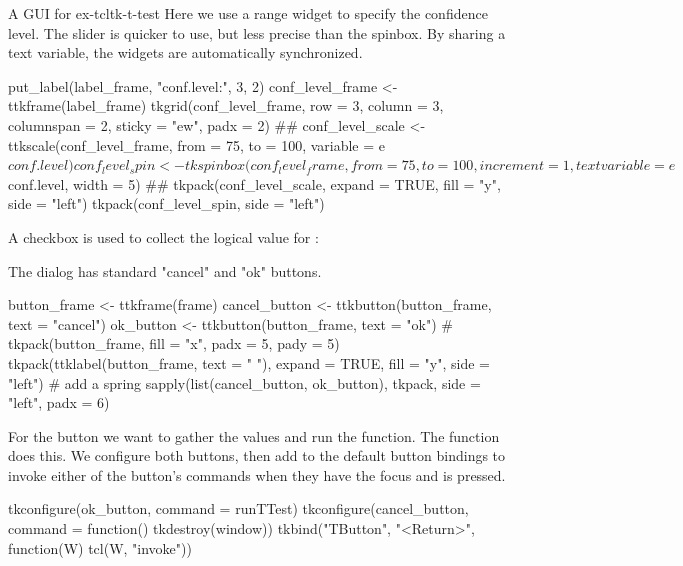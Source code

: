 \begin{example}{A GUI for }{ex-tcltk-t-test}
Here we use a range widget to specify the confidence level. The slider
is quicker to use, but less precise than the spinbox. By sharing a
text variable, the widgets are automatically synchronized.
\begin{Schunk}
\begin{Sinput}
 put_label(label_frame, "conf.level:", 3, 2)
 conf_level_frame <- ttkframe(label_frame)
 tkgrid(conf_level_frame, row = 3, column = 3, columnspan = 2, 
        sticky = "ew", padx = 2)
 ##
 conf_level_scale <- ttkscale(conf_level_frame, 
                      from = 75, to = 100,  
                      variable = e$conf.level)
 conf_level_spin <- tkspinbox(conf_level_frame, 
                      from = 75, to = 100, increment = 1, 
                      textvariable = e$conf.level, width = 5)
 ##
 tkpack(conf_level_scale, expand = TRUE, fill = "y",
        side = "left")
 tkpack(conf_level_spin, side = "left")
\end{Sinput}
\end{Schunk}

A checkbox is used to collect the logical value for :
\begin{Schunk}
\end{Schunk}


The dialog has standard "cancel" and "ok" buttons.
\begin{Schunk}
\begin{Sinput}
 button_frame <- ttkframe(frame)
 cancel_button <- ttkbutton(button_frame, text = "cancel")
 ok_button <- ttkbutton(button_frame, text = "ok")
 #
 tkpack(button_frame, fill = "x", padx = 5, pady = 5)
 tkpack(ttklabel(button_frame, text = " "), expand = TRUE,
        fill = "y", side = "left")               # add a spring
 sapply(list(cancel_button, ok_button), tkpack, 
        side = "left", padx = 6)
\end{Sinput}
\end{Schunk}
%

For the  button we want to gather the values and run the
function. The  function does this.  We configure both
buttons, then add to the default button bindings to invoke either of the button's commands
when they have the focus and  is pressed.
\begin{Schunk}
\begin{Sinput}
 tkconfigure(ok_button, command = runTTest)
 tkconfigure(cancel_button, command = function() tkdestroy(window))
 tkbind("TButton", "<Return>", function(W) tcl(W, "invoke"))
\end{Sinput}
\end{Schunk}


\end{example}
